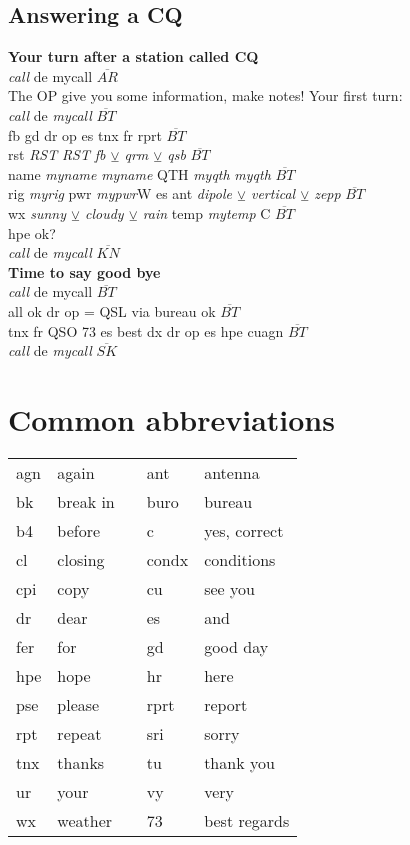 \documentclass[10pt]{article}
\begin{document}
\begin{multicols}{3}
\subsection{Answering a CQ}
\vspace{\baselineskip}
\textbf{Your turn after a station called CQ}\\
\textit{call} de {mycall} $\overline{AR}$\\
The OP give you some information, make notes! 
Your first turn:\\
\textit{call} de \textit{mycall} $\overline{BT}$\\
fb gd dr op es tnx fr rprt $\overline{BT}$\\
rst \textit{RST} \textit{RST} \textit{fb $\veebar$ qrm $\veebar$ qsb} $\overline{BT}$\\
name \textit{myname} \textit{myname} QTH \textit{myqth} \textit{myqth} $\overline{BT}$\\
rig \textit{myrig} pwr \textit{mypwr}W es ant \textit{dipole $\veebar$ vertical $\veebar$ zepp} $\overline{BT}$\\
wx \textit{sunny $\veebar$ cloudy $\veebar$ rain} temp \textit{mytemp} C $\overline{BT}$\\
hpe ok?\\
\textit{call} de \textit{mycall} $\overline{KN}$\\
\textbf{Time to say good bye}\\
\textit{call} de {mycall} $\overline{BT}$\\
all ok dr op = QSL via bureau ok $\overline{BT}$\\
tnx fr QSO 73 es best dx dr op es hpe cuagn $\overline{BT}$\\
\textit{call} de \textit{mycall} $\overline{SK}$\\

\section{Common abbreviations}
\vspace{\baselineskip}
\begin{tabular}{lllll}
agn & again    & & ant & antenna\\
bk & break in  & & buro & bureau\\
b4 & before    & & c & yes, correct\\
cl & closing   & & condx & conditions\\
cpi & copy     & & cu & see you\\
dr & dear      & & es & and \\
fer & for      & & gd & good day\\
hpe & hope     & & hr & here\\
pse & please   & & rprt & report\\
rpt & repeat   & & sri & sorry\\
tnx & thanks   & & tu & thank you\\
ur & your      & & vy & very\\ 
wx & weather   & & 73 & best regards\\
\end{tabular}



\end{multicols}
\end{document}

